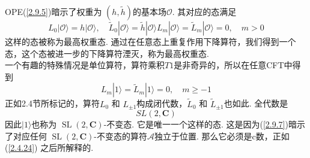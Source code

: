 OPE(\ref{2.9.5})暗示了权重为 $(h, \tilde{h})$的基本场$\mathcal{O}$. 其对应的态满足
\begin{subequations}
\begin{equation}
L_{0}|\mathcal{O}\rangle=h|\mathcal{O}\rangle, \quad \tilde{L}_{0}|\mathcal{O}\rangle=\tilde{h}|\mathcal{O}\rangle
\end{equation}
\begin{equation}
L_{m}|\mathcal{O}\rangle=\tilde{L}_{m}|\mathcal{O}\rangle=0, \quad m>0
\end{equation}
\end{subequations}
这样的态被称为最高权重态. 通过在任意态上重复作用下降算符，我们得到一个态，这个态被进一步的下降算符湮灭，称为最高权重态. \\
一个有趣的特殊情况是单位算符，算符乘积$T1$是非奇异的，所以在任意CFT中得到
\begin{equation}
L_{m}|1\rangle=\tilde{L}_{m}|1\rangle=0, \quad m \geq-1
\end{equation}
正如2.4节所标记的，算符$L_{0}$ 和 $L_{\pm 1}$构成闭代数，$\tilde{L}_{0}$ 和 $\tilde{L}_{\pm 1}$也如此. 全代数是
\begin{equation}
S L(2, \mathbf{C})
\end{equation}
因此$|1\rangle$也称为 $\operatorname{SL}(2, \mathbf{C})$-不变态. 它是唯一一个这样的态. 这是因为(\ref{2.9.7})暗示了对应任何 $\operatorname{SL}(2, \mathbf{C})$-不变态的算符$\mathscr{A}$独立于位置. 那么它必须是c数，正如(\ref{2.4.24}) 之后所解释的. 

